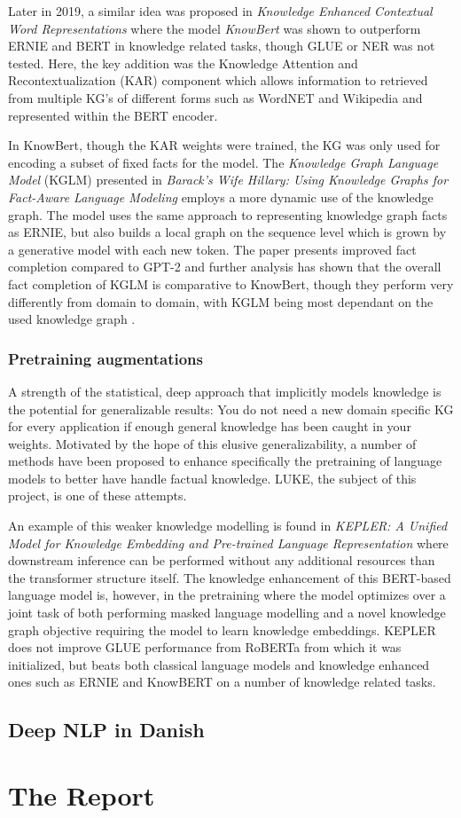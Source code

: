 \documentclass[main.tex]{subfiles}
\begin{document}
Later in 2019, a similar idea was proposed in \emph{Knowledge Enhanced Contextual Word Representations} where the model \emph{KnowBert} \cite{peters2019knowbert} was shown to outperform ERNIE and BERT in knowledge related tasks, though GLUE or NER was not tested.
Here, the key addition was the Knowledge Attention and Recontextualization (KAR) component which allows information to retrieved from multiple KG's of different forms such as WordNET and Wikipedia and represented within the BERT encoder.

In KnowBert, though the KAR weights were trained, the KG was only used for encoding a subset of fixed facts for the model.
The \emph{Knowledge Graph Language Model} (KGLM) presented in \emph{Barack’s Wife Hillary: Using Knowledge Graphs for Fact-Aware Language Modeling} \cite{logan2019barack} employs a more dynamic use of the knowledge graph.
The model uses the same approach to representing knowledge graph facts as ERNIE, but also builds a local graph on the sequence level which is grown by a generative model with each new token.
The paper presents improved fact completion compared to GPT-2 and further analysis has shown that the overall fact completion of KGLM is comparative to KnowBert, though they perform very differently from domain to domain, with KGLM being most dependant on the used knowledge graph \cite{birk2020knowledge}.

\subsubsection{Pretraining augmentations}
A strength of the statistical, deep approach that implicitly models knowledge is the potential for generalizable results:
You do not need a new domain specific KG for every application if enough general knowledge has been caught in your weights.
Motivated by the hope of this elusive generalizability, a number of methods have been proposed to enhance specifically the pretraining of language models to better have handle factual knowledge.
LUKE, the subject of this project, is one of these attempts.

An example of this weaker knowledge modelling is found in \emph{KEPLER: A Unified Model for Knowledge Embedding and Pre-trained Language Representation} \cite{wang2021kepler} where downstream inference can be performed without any additional resources than the transformer structure itself.
The knowledge enhancement of this BERT-based language model is, however, in the pretraining where the model optimizes over a joint task of both performing masked language modelling and a novel knowledge graph objective requiring the model to learn knowledge embeddings.
KEPLER does not improve GLUE performance from RoBERTa \cite{liu2019roberta} from which it was initialized, but beats both classical language models and knowledge enhanced ones such as ERNIE and KnowBERT on a number of knowledge related tasks.

\subsection{Deep NLP in Danish}
%
%

\section{The Report}%
\label{sec:The Report}
\end{document}
